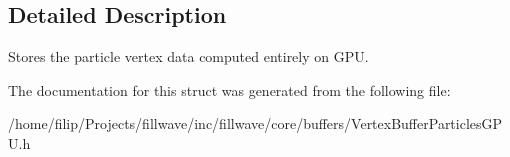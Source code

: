 \subsection{Detailed Description}
Stores the particle vertex data computed entirely on G\+P\+U. 

The documentation for this struct was generated from the following file\+:\begin{DoxyCompactItemize}
\item 
/home/filip/\+Projects/fillwave/inc/fillwave/core/buffers/Vertex\+Buffer\+Particles\+G\+P\+U.\+h\end{DoxyCompactItemize}
